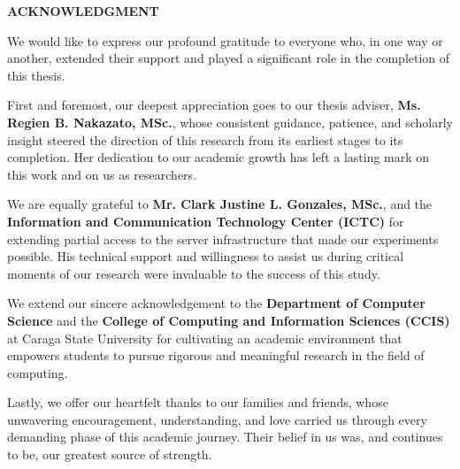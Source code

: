 \thispagestyle{fancy}
\vspace*{-1.5cm}
\begin{center}
\textbf{\fontsize{14}{16}\selectfont ACKNOWLEDGMENT}
\end{center}

We would like to express our profound gratitude to everyone who, in one way or another, extended their support and played a significant role in the completion of this thesis.

\vspace{1em}

First and foremost, our deepest appreciation goes to our thesis adviser, \textbf{Ms. Regien B. Nakazato, MSc.}, whose consistent guidance, patience, and scholarly insight steered the direction of this research from its earliest stages to its completion. Her dedication to our academic growth has left a lasting mark on this work and on us as researchers.

\vspace{1em}

We are equally grateful to \textbf{Mr. Clark Justine L. Gonzales, MSc.}, and the \textbf{Information and Communication Technology Center (ICTC)} for extending partial access to the server infrastructure that made our experiments possible. His technical support and willingness to assist us during critical moments of our research were invaluable to the success of this study.

\vspace{1em}

We extend our sincere acknowledgement to the \textbf{Department of Computer Science} and the \textbf{College of Computing and Information Sciences (CCIS)} at Caraga State University for cultivating an academic environment that empowers students to pursue rigorous and meaningful research in the field of computing.

\vspace{1em}

Lastly, we offer our heartfelt thanks to our families and friends, whose unwavering encouragement, understanding, and love carried us through every demanding phase of this academic journey. Their belief in us was, and continues to be, our greatest source of strength.
